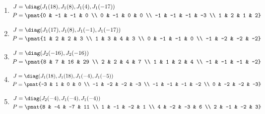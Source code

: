 \begin{enumerate}
\item

\begin{align*}
J &= \diag(J_{1}(18), J_{1}(8), J_{1}(4), J_{1}(-17))\\
P &= \pmat{0 & -1 & -1 & 0 \\ 0 & -1 & 0 & 0 \\ -1 & -1 & -1 & -3 \\ 1 & 2 & 1 & 2}
\end{align*}

\item

\begin{align*}
J &= \diag(J_{1}(17), J_{1}(8), J_{1}(-1), J_{1}(-17))\\
P &= \pmat{1 & 2 & 2 & 3 \\ 1 & 3 & 4 & 3 \\ 0 & -1 & -1 & 0 \\ -1 & -2 & -2 & -2}
\end{align*}

\item

\begin{align*}
J &= \diag(J_{2}(-16), J_{2}(-16))\\
P &= \pmat{8 & 7 & 16 & 29 \\ 2 & 2 & 4 & 7 \\ 1 & 1 & 2 & 4 \\ -1 & -1 & -1 & -2}
\end{align*}

\item

\begin{align*}
J &= \diag(J_{1}(18), J_{1}(18), J_{1}(-4), J_{1}(-5))\\
P &= \pmat{-3 & 1 & 0 & 0 \\ -1 & -2 & -2 & -3 \\ -1 & -1 & -1 & -2 \\ 0 & -2 & -2 & -3}
\end{align*}

\item

\begin{align*}
J &= \diag(J_{2}(-4), J_{1}(-4), J_{1}(-4))\\
P &= \pmat{8 & -4 & -7 & 11 \\ 1 & -1 & -2 & 1 \\ 4 & -2 & -3 & 6 \\ 2 & -1 & -2 & 3}
\end{align*}


\end{enumerate}
